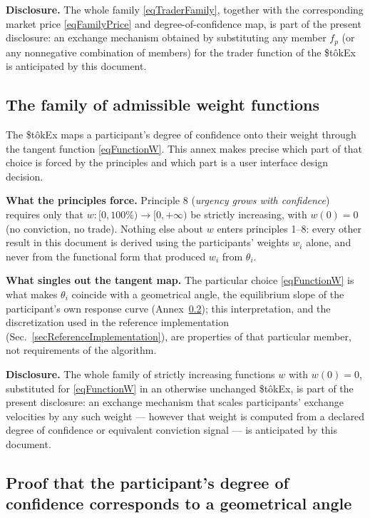 \documentclass[letterpaper]{article}
\newcommand{\StokEx}{\$t\^{o}kEx}
\begin{document}
\textbf{Disclosure.} The whole family \eqref{eqTraderFamily}, together with the corresponding market price \eqref{eqFamilyPrice} and degree-of-confidence map, is part of the present disclosure: an exchange mechanism obtained by substituting any member $f_p$ (or any nonnegative combination of members) for the trader function of the \StokEx{} is anticipated by this document.

\subsection{The family of admissible weight functions}\label{secWeightFamily}

The \StokEx{} maps a participant's degree of confidence onto their weight through the tangent function \eqref{eqFunctionW}.
This annex makes precise which part of that choice is forced by the principles and which part is a user interface design decision.

\textbf{What the principles force.} Principle 8 (\emph{urgency grows with confidence}) requires only that $w: [0,100\%) \to [0,+\infty)$ be strictly increasing, with $w(0) = 0$ (no conviction, no trade).
Nothing else about $w$ enters principles 1--8: every other result in this document is derived using the participants' weights $w_i$ alone, and never from the functional form that produced $w_i$ from $\theta_i$.

\textbf{What singles out the tangent map.} The particular choice \eqref{eqFunctionW} is what makes $\theta_i$ coincide with a geometrical angle, the equilibrium slope of the participant's own response curve (Annex~\ref{secProofDegree}); this interpretation, and the discretization used in the reference implementation (Sec.~\ref{secReferenceImplementation}), are properties of that particular member, not requirements of the algorithm.

\textbf{Disclosure.} The whole family of strictly increasing functions $w$ with $w(0) = 0$, substituted for \eqref{eqFunctionW} in an otherwise unchanged \StokEx{}, is part of the present disclosure: an exchange mechanism that scales participants' exchange velocities by any such weight --- however that weight is computed from a declared degree of confidence or equivalent conviction signal --- is anticipated by this document.


\subsection{Proof that the participant's degree of confidence corresponds to a geometrical angle}\label{secProofDegree}
\end{document}
